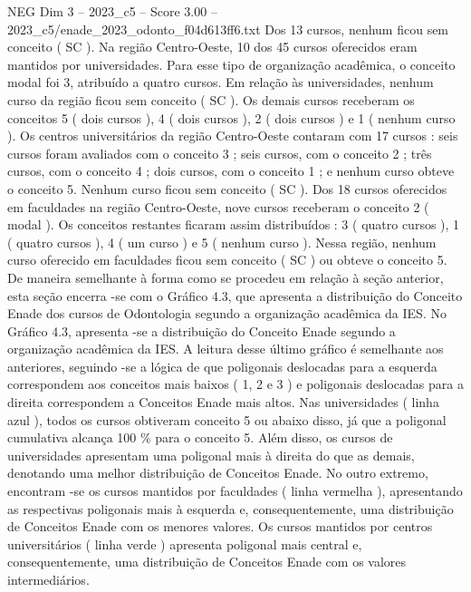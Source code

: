 \begin{textsample}{NEG Dim 3 – 2023\_c5 – Score 3.00 – 2023\_c5/enade\_2023\_odonto\_f04d613ff6.txt}
Dos 13 cursos, nenhum ficou sem conceito ( SC ).
Na região Centro-Oeste, 10 dos 45 cursos oferecidos eram mantidos por universidades.
Para esse tipo de organização acadêmica, o conceito modal foi 3, atribuído a quatro cursos.
Em relação às universidades, nenhum curso da região ficou sem conceito ( SC ).
Os demais cursos receberam os conceitos 5 ( dois cursos ), 4 ( dois cursos ), 2 ( dois cursos ) e 1 ( nenhum curso ).
Os centros universitários da região Centro-Oeste contaram com 17 cursos : seis cursos foram avaliados com o conceito 3 ; seis cursos, com o conceito 2 ; três cursos, com o conceito 4 ; dois cursos, com o conceito 1 ; e nenhum curso obteve o conceito 5.
Nenhum curso ficou sem conceito ( SC ).
Dos 18 cursos oferecidos em faculdades na região Centro-Oeste, nove cursos receberam o conceito 2 ( modal ).
Os conceitos restantes ficaram assim distribuídos : 3 ( quatro cursos ), 1 ( quatro cursos ), 4 ( um curso ) e 5 ( nenhum curso ).
Nessa região, nenhum curso oferecido em faculdades ficou sem conceito ( SC ) ou obteve o conceito 5.
De maneira semelhante à forma como se procedeu em relação à seção anterior, esta seção encerra -se com o Gráfico 4.3, que apresenta a distribuição do Conceito Enade dos cursos de Odontologia segundo a organização acadêmica da IES.
No Gráfico 4.3, apresenta -se a distribuição do Conceito Enade segundo a organização acadêmica da IES.
A leitura desse último gráfico é semelhante aos anteriores, seguindo -se a lógica de que poligonais deslocadas para a esquerda correspondem aos conceitos mais baixos ( 1, 2 e 3 ) e poligonais deslocadas para a direita correspondem a Conceitos Enade mais altos.
Nas universidades ( linha azul ), todos os cursos obtiveram conceito 5 ou abaixo disso, já que a poligonal cumulativa alcança 100 \% para o conceito 5.
Além disso, os cursos de universidades apresentam uma poligonal mais à direita do que as demais, denotando uma melhor distribuição de Conceitos Enade.
No outro extremo, encontram -se os cursos mantidos por faculdades ( linha vermelha ), apresentando as respectivas poligonais mais à esquerda e, consequentemente, uma distribuição de Conceitos Enade com os menores valores.
Os cursos mantidos por centros universitários ( linha verde ) apresenta poligonal mais central e, consequentemente, uma distribuição de Conceitos Enade com os valores intermediários.

\end{textsample}
